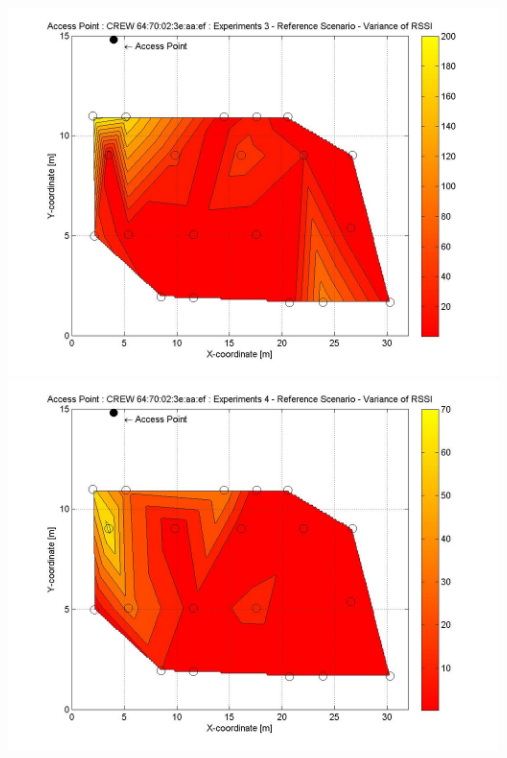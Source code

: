 \documentclass[11pt,a4paper,headinclude,footinclude,chapterprefix=on]{scrreprt}
\begin{document}
\begin{longtable}
	\includegraphics[width=13cm]{../../Source/plot/CREW_ef/ef_Ref_Ex_3_Variance.jpg} \\
	\includegraphics[width=13cm]{../../Source/plot/CREW_ef/ef_Ref_Ex_4_Variance.jpg} 
\end{longtable}
\end{document}
